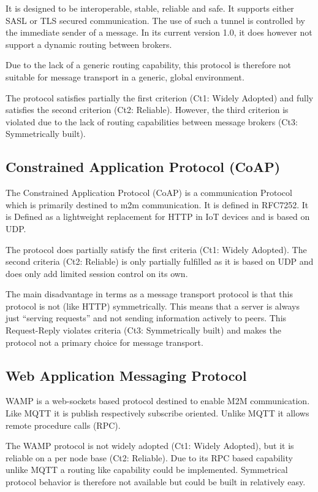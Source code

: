 \documentclass[a4paper,appendixprefix,pdfusetitle,twocolumn,fontsize=8pt,draft,DIV=calc]{scrbook}
\begin{document}
It is designed to be interoperable, stable, reliable and safe. It supports either SASL or TLS secured communication. The use of such a tunnel is controlled by the immediate sender of a message. In its current version 1.0, it does however not support a dynamic routing between brokers\cite{amqp}.

Due to the lack of a generic routing capability, this protocol is therefore not suitable for message transport in a generic, global environment.

The protocol satisfies partially the first criterion (Ct1: Widely Adopted) and fully satisfies the second criterion (Ct2: Reliable). However, the third criterion is violated due to the lack of routing capabilities between message brokers (Ct3: Symmetrically built).

\subsection{Constrained Application Protocol (CoAP)}
The Constrained Application Protocol (CoAP) is a communication Protocol which is primarily destined to m2m communication. It is defined in RFC7252\cite{RFC7252}.  It is Defined as a lightweight replacement for HTTP in IoT devices and is based on UDP.

The protocol does partially satisfy the first criteria (Ct1: Widely Adopted). The second criteria (Ct2: Reliable) is only partially fulfilled as it is based on UDP and does only add limited session control on its own.

The main disadvantage in terms as a message transport protocol is that this protocol is not (like HTTP) symmetrically. This means that a server is always just ``serving requests'' and not sending information actively to peers. This Request-Reply violates criteria (Ct3: Symmetrically built) and makes the protocol not a primary choice for message transport. 

\subsection{Web Application Messaging Protocol}
WAMP is a web-sockets based protocol destined to enable M2M communication. Like MQTT it is publish respectively subscribe oriented. Unlike MQTT it allows remote procedure calls (RPC).

The WAMP protocol is not widely adopted (Ct1: Widely Adopted), but it is reliable on a per node base (Ct2: Reliable). Due to its RPC based capability unlike MQTT a routing like capability could be implemented. Symmetrical protocol behavior is therefore not available but could be built in relatively easy.
\end{document}
